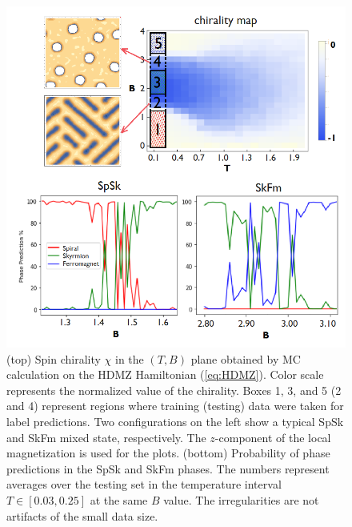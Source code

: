 \documentclass[reprint,amsmath,amssymb,aps,showpacs,superscriptaddress,prb]{revtex4-1}
\begin{document}
\begin{figure}[h]
\includegraphics[scale=0.5]{fig2.png}
\caption{(top) Spin chirality $\chi$ in the $(T,B)$ plane obtained by MC calculation on the HDMZ Hamiltonian (\ref{eq:HDMZ}). Color scale represents the normalized value of the chirality. Boxes 1, 3, and 5 (2 and 4) represent regions where training (testing) data were taken for label predictions. Two configurations on the left show a typical SpSk and SkFm mixed state, respectively. The $z$-component of the local magnetization is used for the plots. (bottom) Probability of phase predictions in the SpSk and SkFm phases. The numbers represent averages over the testing set in the temperature interval $T\in[0.03,0.25]$ at the same $B$ value. The irregularities are not artifacts of the small data size.}\label{fig:2}
\end{figure}
\end{document}
